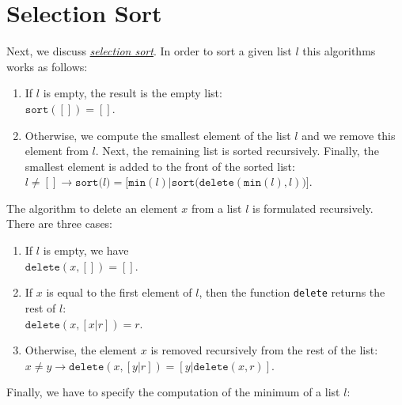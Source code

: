 \section{Selection Sort}
Next, we discuss 
\href{http://en.wikipedia.org/wiki/Selection_sort}{\emph{selection sort}}.  In order to sort a given
list $l$ this algorithms works as
follows:
\begin{enumerate}
\item If $l$ is empty, the result is the empty list: \\[0.2cm]
      \hspace*{1.3cm} $\mathtt{sort}([]) = []$.
\item Otherwise, we compute the smallest element of the list $l$ and we remove this element from
      $l$.  Next, the remaining list is sorted recursively.  Finally, the smallest element is added
      to the front of the sorted list:
      \\[0.2cm]
      \hspace*{1.3cm} 
      $l \not= [] \rightarrow \mathtt{sort}\bigl(l\bigr) = \bigl[\texttt{min}(l)\bigr| \mathtt{sort}\bigl(\mathtt{delete}(\texttt{min}(l), l)\bigr)\bigr]$.
\end{enumerate}
The algorithm to delete an element $x$ from a list $l$ is formulated recursively.  There are three cases:
\begin{enumerate}
\item If $l$ is empty, we have \\[0.2cm]
      \hspace*{1.3cm} $\mathtt{delete}(x, []) = []$.
\item If $x$ is equal to the first element of $l$, then the function \texttt{delete} returns the
      rest of $l$: \\[0.2cm]
      \hspace*{1.3cm} 
      $\mathtt{delete}(x, [x|r]) = r$.
\item Otherwise, the element $x$ is removed recursively from the rest of the list: \\[0.2cm]
      \hspace*{1.3cm}   
      $x \not = y \rightarrow \mathtt{delete}(x, [y|r]) = [y|\mathtt{delete}(x,r)]$.
\end{enumerate}
Finally, we have to specify the computation of the minimum of a list $l$:
